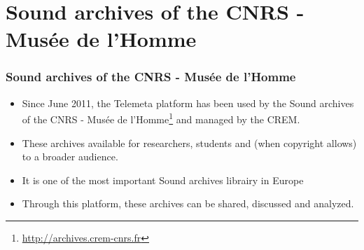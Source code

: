 \documentclass[final, hyperref, table]{beamer}
\begin{document}
\section[CREM archives]{Sound archives of the CNRS - Musée de l'Homme}\label{sec:archives-CREM}
   \begin{frame}\frametitle{Sound archives of the CNRS - Musée de l'Homme}
     \begin{block}{}
       \begin{itemize}
       \item Since June 2011, the Telemeta platform has been used by
         the \alert{Sound archives of the CNRS - Musée de
         l'Homme}\footnote{\url{http://archives.crem-cnrs.fr}} and
         managed by the CREM.
       \item These archives available for researchers,
         students and (when copyright allows) to a broader audience.
       \item It is one of the most important Sound archives librairy in Europe
       \item Through this platform, these archives can be shared,
         discussed and analyzed.
       
       
       \end{itemize}
     \end{block}


\end{frame}
\end{document}
